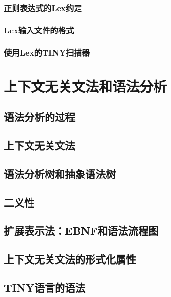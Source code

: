\documentclass[lang=cn,10pt]{elegantbook}
\begin{document}
\subsection{正则表达式的Lex约定}

\subsection{Lex输入文件的格式}

\subsection{使用Lex的TINY扫描器}

\chapter{上下文无关文法和语法分析}
\label{chap:3}

\section{语法分析的过程}
\label{sec:3-1}

\section{上下文无关文法}
\label{sec:3-2}

\section{语法分析树和抽象语法树}
\label{sec:3-3}

\section{二义性}
\label{sec:3-4}

\section{扩展表示法：EBNF和语法流程图}
\label{sec:3-5}

\section{上下文无关文法的形式化属性}
\label{sec:3-6}

\section{TINY语言的语法}
\label{sec:3-7}
\end{document}
